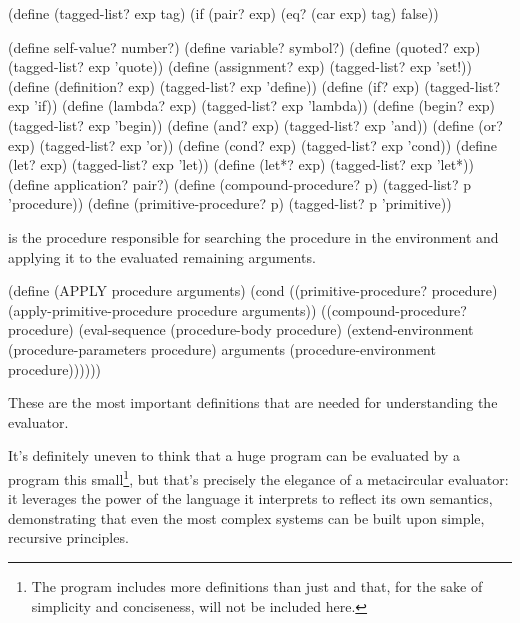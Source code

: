   \begin{code}
(define (tagged-list? exp tag)
  (if (pair? exp)
      (eq? (car exp) tag)
      false))

(define self-value?              number?)
(define variable?                symbol?)
(define (quoted? exp)            (tagged-list? exp 'quote))
(define (assignment? exp)        (tagged-list? exp 'set!))
(define (definition? exp)        (tagged-list? exp 'define))
(define (if? exp)                (tagged-list? exp 'if))
(define (lambda? exp)            (tagged-list? exp 'lambda))
(define (begin? exp)             (tagged-list? exp 'begin))
(define (and? exp)               (tagged-list? exp 'and))
(define (or? exp)                (tagged-list? exp 'or))
(define (cond? exp)              (tagged-list? exp 'cond))
(define (let? exp)               (tagged-list? exp 'let))
(define (let*? exp)              (tagged-list? exp 'let*))
(define application?             pair?)
(define (compound-procedure? p)  (tagged-list? p 'procedure))
(define (primitive-procedure? p) (tagged-list? p 'primitive))
  \end{code}

   is the procedure responsible for searching the procedure in the environment and applying it to the evaluated remaining arguments.

  \begin{code}
  (define (APPLY procedure arguments)
    (cond
      ((primitive-procedure? procedure)
       (apply-primitive-procedure procedure arguments))
      ((compound-procedure? procedure)
       (eval-sequence (procedure-body procedure)
                      (extend-environment (procedure-parameters procedure)
                                          arguments
                                          (procedure-environment procedure))))))
  \end{code}

  These are the most important definitions that are needed for understanding the evaluator.

  It's definitely uneven to think that a huge program can be evaluated by a program this small\footnote{The program includes more definitions than just  and  that, for the sake of simplicity and conciseness, will not be included here.}, but that's precisely the elegance of a metacircular evaluator: it leverages the power of the language it interprets to reflect its own semantics, demonstrating that even the most complex systems can be built upon simple, recursive principles.

